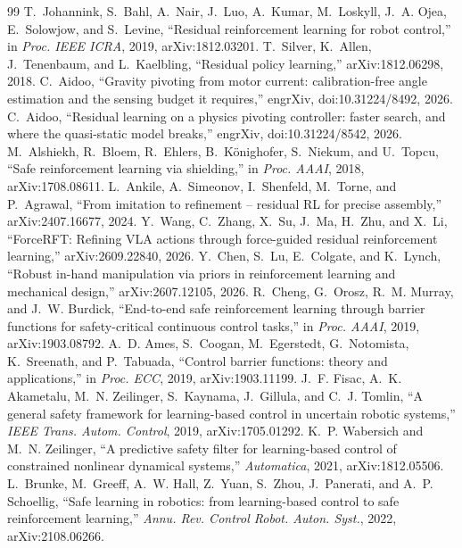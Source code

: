 \begin{thebibliography}{99}\setlength{\itemsep}{0pt}
 T.~Johannink, S.~Bahl, A.~Nair, J.~Luo, A.~Kumar, M.~Loskyll, J.~A. Ojea, E.~Solowjow, and S.~Levine, ``Residual reinforcement learning for robot control,'' in \emph{Proc. IEEE ICRA}, 2019, arXiv:1812.03201.
 T.~Silver, K.~Allen, J.~Tenenbaum, and L.~Kaelbling, ``Residual policy learning,'' arXiv:1812.06298, 2018.
 C.~Aidoo, ``Gravity pivoting from motor current: calibration-free angle estimation and the sensing budget it requires,'' engrXiv, doi:10.31224/8492, 2026.
 C.~Aidoo, ``Residual learning on a physics pivoting controller: faster search, and where the quasi-static model breaks,'' engrXiv, doi:10.31224/8542, 2026.
 M.~Alshiekh, R.~Bloem, R.~Ehlers, B.~K{\"o}nighofer, S.~Niekum, and U.~Topcu, ``Safe reinforcement learning via shielding,'' in \emph{Proc. AAAI}, 2018, arXiv:1708.08611.
 L.~Ankile, A.~Simeonov, I.~Shenfeld, M.~Torne, and P.~Agrawal, ``From imitation to refinement -- residual RL for precise assembly,'' arXiv:2407.16677, 2024.
 Y.~Wang, C.~Zhang, X.~Su, J.~Ma, H.~Zhu, and X.~Li, ``ForceRFT: Refining VLA actions through force-guided residual reinforcement learning,'' arXiv:2609.22840, 2026.
 Y.~Chen, S.~Lu, E.~Colgate, and K.~Lynch, ``Robust in-hand manipulation via priors in reinforcement learning and mechanical design,'' arXiv:2607.12105, 2026.
 R.~Cheng, G.~Orosz, R.~M. Murray, and J.~W. Burdick, ``End-to-end safe reinforcement learning through barrier functions for safety-critical continuous control tasks,'' in \emph{Proc. AAAI}, 2019, arXiv:1903.08792.
 A.~D. Ames, S.~Coogan, M.~Egerstedt, G.~Notomista, K.~Sreenath, and P.~Tabuada, ``Control barrier functions: theory and applications,'' in \emph{Proc. ECC}, 2019, arXiv:1903.11199.
 J.~F. Fisac, A.~K. Akametalu, M.~N. Zeilinger, S.~Kaynama, J.~Gillula, and C.~J. Tomlin, ``A general safety framework for learning-based control in uncertain robotic systems,'' \emph{IEEE Trans. Autom. Control}, 2019, arXiv:1705.01292.
 K.~P. Wabersich and M.~N. Zeilinger, ``A predictive safety filter for learning-based control of constrained nonlinear dynamical systems,'' \emph{Automatica}, 2021, arXiv:1812.05506.
 L.~Brunke, M.~Greeff, A.~W. Hall, Z.~Yuan, S.~Zhou, J.~Panerati, and A.~P. Schoellig, ``Safe learning in robotics: from learning-based control to safe reinforcement learning,'' \emph{Annu. Rev. Control Robot. Auton. Syst.}, 2022, arXiv:2108.06266.

\end{thebibliography}
